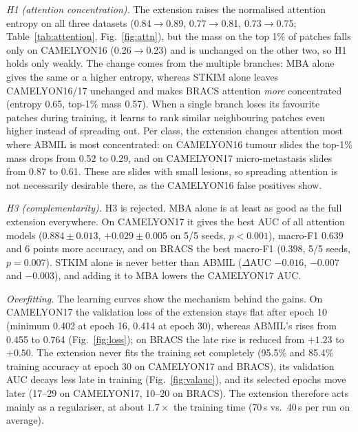 \documentclass[conference]{IEEEtran}
\begin{document}
\emph{H1 (attention concentration).} The extension raises the normalised attention entropy on all three datasets (0.84$\to$0.89, 0.77$\to$0.81, 0.73$\to$0.75; Table~\ref{tab:attention}, Fig.~\ref{fig:attn}), but the mass on the top 1\% of patches falls only on CAMELYON16 (0.26$\to$0.23) and is unchanged on the other two, so H1 holds only weakly. The change comes from the multiple branches: MBA alone gives the same or a higher entropy, whereas STKIM alone leaves CAMELYON16/17 unchanged and makes BRACS attention \emph{more} concentrated (entropy 0.65, top-1\% mass 0.57). When a single branch loses its favourite patches during training, it learns to rank similar neighbouring patches even higher instead of spreading out. Per class, the extension changes attention most where ABMIL is most concentrated: on CAMELYON16 tumour slides the top-1\% mass drops from 0.52 to 0.29, and on CAMELYON17 micro-metastasis slides from 0.87 to 0.61. These are slides with small lesions, so spreading attention is not necessarily desirable there, as the CAMELYON16 false positives show.

\emph{H3 (complementarity).} H3 is rejected. MBA alone is at least as good as the full extension everywhere. On CAMELYON17 it gives the best AUC of all attention models ($0.884\pm0.013$, $+0.029\pm0.005$ on 5/5 seeds, $p<0.001$), macro-F1 0.639 and 6 points more accuracy, and on BRACS the best macro-F1 (0.398, 5/5 seeds, $p=0.007$). STKIM alone is never better than ABMIL ($\Delta$AUC $-0.016$, $-0.007$ and $-0.003$), and adding it to MBA lowers the CAMELYON17 AUC.

\emph{Overfitting.} The learning curves show the mechanism behind the gains. On CAMELYON17 the validation loss of the extension stays flat after epoch 10 (minimum 0.402 at epoch 16, 0.414 at epoch 30), whereas ABMIL's rises from 0.455 to 0.764 (Fig.~\ref{fig:loss}); on BRACS the late rise is reduced from $+1.23$ to $+0.50$. The extension never fits the training set completely (95.5\% and 85.4\% training accuracy at epoch 30 on CAMELYON17 and BRACS), its validation AUC decays less late in training (Fig.~\ref{fig:valauc}), and its selected epochs move later (17--29 on CAMELYON17, 10--20 on BRACS). The extension therefore acts mainly as a regulariser, at about $1.7\times$ the training time (70\,s vs.\ 40\,s per run on average).
\end{document}
